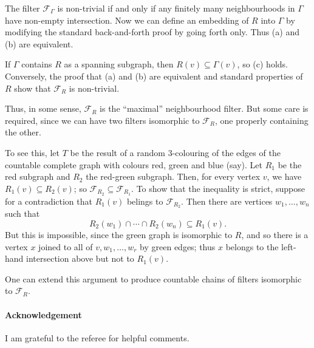 \documentclass[12pt]{article}
\newenvironment{proof}{\prepf\rm}{\endprepf}
\begin{document}
\begin{proof}
The filter $\mathcal{F}_\Gamma$ is non-trivial if and only if any finitely
many neighbourhoods in $\Gamma$ have non-empty intersection. Now we can
define an embedding of $R$ into $\Gamma$ by modifying the standard
back-and-forth proof by going forth only. Thus (a) and (b) are equivalent.

If $\Gamma$ contains $R$ as a spanning subgraph, then $R(v)\subseteq\Gamma(v)$,
so (c) holds. Conversely, the proof that (a) and (b) are equivalent and 
standard properties of $R$ show that $\mathcal{F}_R$ is non-trivial.
\end{proof}

Thus, in some sense, $\mathcal{F}_R$ is the ``maximal'' neighbourhood filter.
But some care is required, since we can have two filters isomorphic to
$\mathcal{F}_R$, one properly containing the other.

To see this, let $T$ be the result of a random $3$-colouring of the edges of
the countable complete graph with colours red, green and blue (say). Let $R_1$
be the red subgraph and $R_2$ the red-green subgraph. Then, for every vertex
$v$, we have $R_1(v)\subseteq R_2(v)$;
so $\mathcal{F}_{R_2}\subseteq\mathcal{F}_{R_1}$. To show that the inequality
is strict, suppose for a contradiction that $R_1(v)$ belings to
$\mathcal{F}_{R_2}$. Then there are vertices $w_1,\ldots,w_n$ such that
\[R_2(w_1)\cap\cdots\cap R_2(w_n)\subseteq R_1(v).\]
But this is impossible, since the green graph is isomorphic to $R$, and so
there is a vertex $x$ joined to all of $v,w_1,\ldots,w_r$ by green edges;
thus $x$ belongs to the left-hand intersection above but not to $R_1(v)$.

One can extend this argument to produce countable chains of filters isomorphic
to $\mathcal{F}_R$.

\paragraph{Acknowledgement} I am grateful to the referee for helpful comments.
\end{document}
